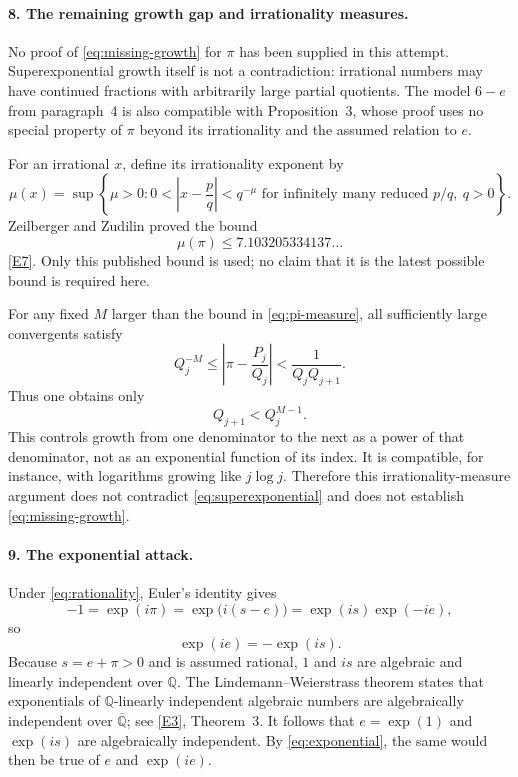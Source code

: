 \documentclass[11pt]{article}
\newcommand{\Q}{\mathbb Q}
\newcommand{\Qbar}{\overline{\mathbb Q}}
\begin{document}
\paragraph{8. The remaining growth gap and irrationality measures.}
No proof of \eqref{eq:missing-growth} for $\pi$ has been supplied in this
attempt. Superexponential growth itself is not a contradiction: irrational
numbers may have continued fractions with arbitrarily large partial
quotients. The model $6-e$ from paragraph~4 is also compatible with
Proposition~3, whose proof uses no special property of $\pi$ beyond its
irrationality and the assumed relation to $e$.

For an irrational $x$, define its irrationality exponent by
\[
 \mu(x)=\sup\left\{\mu>0:
 0<\left|x-\frac pq\right|<q^{-\mu}
 \text{ for infinitely many reduced }p/q,\ q>0\right\}.
\]
Zeilberger and Zudilin proved the bound
\begin{equation}\label{eq:pi-measure}
 \mu(\pi)\le7.103205334137\ldots
\end{equation}
\href{https://arxiv.org/abs/1912.06345}{[E7]}.
Only this published bound is used; no claim that it is the latest possible
bound is required here.

For any fixed $M$ larger than the bound in \eqref{eq:pi-measure}, all
sufficiently large convergents satisfy
\[
 Q_j^{-M}\le\left|\pi-\frac{P_j}{Q_j}\right|
 <\frac1{Q_jQ_{j+1}}.
\]
Thus one obtains only
\begin{equation}\label{eq:power-growth}
 Q_{j+1}<Q_j^{M-1}.
\end{equation}
This controls growth from one denominator to the next as a power of that
denominator, not as an exponential function of its index. It is compatible,
for instance, with logarithms growing like $j\log j$. Therefore this
irrationality-measure argument does not contradict
\eqref{eq:superexponential} and does not establish
\eqref{eq:missing-growth}.

\paragraph{9. The exponential attack.}
Under \eqref{eq:rationality}, Euler's identity gives
\[
 -1=\exp(i\pi)=\exp\bigl(i(s-e)\bigr)=\exp(is)\exp(-ie),
\]
so
\begin{equation}\label{eq:exponential}
 \boxed{\exp(ie)=-\exp(is).}
\end{equation}
Because $s=e+\pi>0$ and is assumed rational, $1$ and $is$ are algebraic and
linearly independent over $\Q$. The Lindemann--Weierstrass theorem states
that exponentials of $\Q$-linearly independent algebraic numbers are
algebraically independent over $\Qbar$; see
\href{https://arxiv.org/html/2406.01296v1}{[E3]}, Theorem~3.
It follows that $e=\exp(1)$ and $\exp(is)$ are algebraically independent.
By \eqref{eq:exponential}, the same would then be true of $e$ and $\exp(ie)$.
\end{document}

